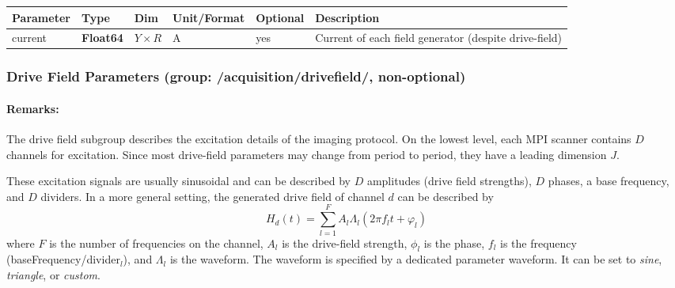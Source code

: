 \documentclass[landscape,a4paper]{article} %
\newcommand{\inltab}[1]{{\ttfamily\bfseries\color{blue}#1}}
\newcommand{\inlvar}[1]{{\ttfamily#1}}
\begin{document}
\noindent \begin{tabularx}{\columnwidth}{lllllX}
\textbf{Parameter} & \textbf{Type} & \textbf{Dim} & \textbf{Unit/Format} & \textbf{Optional} & \textbf{Description} \\ \hline
\inlvar{current} & \inltab{Float64} & $Y \times R$ & A & yes & Current of each field generator (despite drive-field)  \\ \hline


\end{tabularx}

\subsubsection{Drive Field Parameters (group: \inlvar{/acquisition/drivefield/}, non-optional)}

\begin{multicols}{2}
\paragraph{Remarks:} The drive field subgroup describes the excitation details of the imaging protocol. On the lowest level, each MPI scanner contains $D$ channels for excitation. Since most drive-field parameters may change from period to period, they have a leading dimension $J$.

These excitation signals are usually sinusoidal and can be described by $D$ amplitudes (drive field strengths), $D$ phases, a base frequency, and $D$ dividers. In a more general setting, the generated drive field of channel $d$ can be described by
$$
H_d(t) = \sum_{l=1}^{F} A_l \Lambda_l (2\pi f_l t + \varphi_l)
$$
where $F$ is the number of frequencies on the channel, $A_l$ is the drive-field strength, $\phi_l$ is the phase, $f_l$ is the frequency (\inlvar{baseFrequency}/\inlvar{divider}$_l$), and $\Lambda_l$ is the waveform. The waveform is specified by a dedicated parameter \inlvar{waveform}. It can be set to \textit{sine}, \textit{triangle}, or \textit{custom}. 
\end{multicols}
\end{document}
